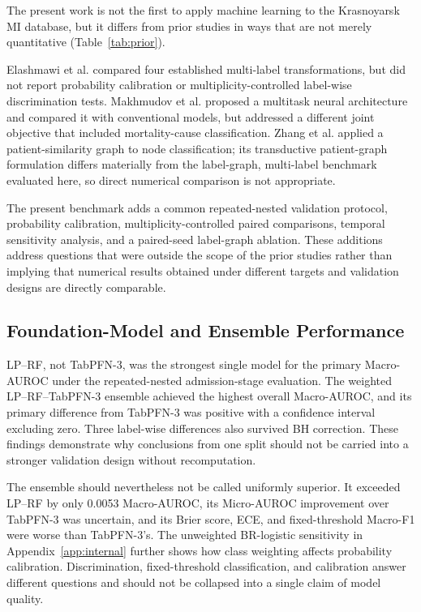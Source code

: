 \documentclass{ieeeaccess}
\begin{document}
The present work is not the first to apply machine learning to the Krasnoyarsk MI database, but it differs from prior studies in ways that are not merely quantitative (Table~\ref{tab:prior}).

Elashmawi et al. \cite{elashmawi2024} compared four established multi-label transformations, but did not report probability calibration or multiplicity-controlled label-wise discrimination tests. Makhmudov et al. \cite{makhmudov2025} proposed a multitask neural architecture and compared it with conventional models, but addressed a different joint objective that included mortality-cause classification. Zhang et al. \cite{jia2025} applied a patient-similarity graph to node classification; its transductive patient-graph formulation differs materially from the label-graph, multi-label benchmark evaluated here, so direct numerical comparison is not appropriate.

The present benchmark adds a common repeated-nested validation protocol, probability calibration, multiplicity-controlled paired comparisons, temporal sensitivity analysis, and a paired-seed label-graph ablation. These additions address questions that were outside the scope of the prior studies rather than implying that numerical results obtained under different targets and validation designs are directly comparable.

\subsection{Foundation-Model and Ensemble Performance}

LP--RF, not TabPFN-3, was the strongest single model for the primary Macro-AUROC under the repeated-nested admission-stage evaluation. The weighted LP--RF--TabPFN-3 ensemble achieved the highest overall Macro-AUROC, and its primary difference from TabPFN-3 was positive with a confidence interval excluding zero. Three label-wise differences also survived BH correction. These findings demonstrate why conclusions from one split should not be carried into a stronger validation design without recomputation.

The ensemble should nevertheless not be called uniformly superior. It exceeded LP--RF by only 0.0053 Macro-AUROC, its Micro-AUROC improvement over TabPFN-3 was uncertain, and its Brier score, ECE, and fixed-threshold Macro-F1 were worse than TabPFN-3's. The unweighted BR-logistic sensitivity in Appendix~\ref{app:internal} further shows how class weighting affects probability calibration. Discrimination, fixed-threshold classification, and calibration answer different questions and should not be collapsed into a single claim of model quality.
\end{document}
